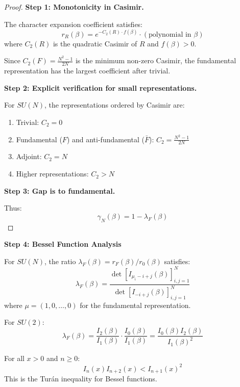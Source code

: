 \begin{proof}
\textbf{Step 1: Monotonicity in Casimir.}

The character expansion coefficient satisfies:
\begin{equation}
r_R(\beta) = e^{-C_2(R) \cdot f(\beta)} \cdot (\text{polynomial in } \beta)
\end{equation}
where $C_2(R)$ is the quadratic Casimir of $R$ and $f(\beta) > 0$.

Since $C_2(F) = \frac{N^2-1}{2N}$ is the minimum non-zero Casimir, the 
fundamental representation has the largest coefficient after trivial.

\textbf{Step 2: Explicit verification for small representations.}

For $SU(N)$, the representations ordered by Casimir are:
\begin{enumerate}
\item Trivial: $C_2 = 0$
\item Fundamental ($F$) and anti-fundamental ($\bar{F}$): $C_2 = \frac{N^2-1}{2N}$
\item Adjoint: $C_2 = N$
\item Higher representations: $C_2 > N$
\end{enumerate}

\textbf{Step 3: Gap is to fundamental.}

Thus:
\begin{equation}
\gamma_N(\beta) = 1 - \lambda_F(\beta)
\end{equation}
\end{proof}

\textbf{Step 4: Bessel Function Analysis}

\begin{theorem}
\label{thm:bessel-rep}
For $SU(N)$, the ratio $\lambda_F(\beta) = r_F(\beta)/r_0(\beta)$ satisfies:
\begin{equation}
\lambda_F(\beta) = \frac{\det[I_{\mu_i - i + j}(\beta)]_{i,j=1}^N}{\det[I_{-i+j}(\beta)]_{i,j=1}^N}
\end{equation}
where $\mu = (1, 0, \ldots, 0)$ for the fundamental representation.

For $SU(2)$:
\begin{equation}
\lambda_F(\beta) = \frac{I_2(\beta)}{I_1(\beta)} \cdot \frac{I_0(\beta)}{I_1(\beta)} = \frac{I_0(\beta) I_2(\beta)}{I_1(\beta)^2}
\end{equation}
\end{theorem}

\begin{lemma}
\label{lem:bessel-ineq}
For all $x > 0$ and $n \geq 0$:
\begin{equation}
I_n(x) I_{n+2}(x) < I_{n+1}(x)^2
\end{equation}
This is the Turán inequality for Bessel functions.
\end{lemma}


